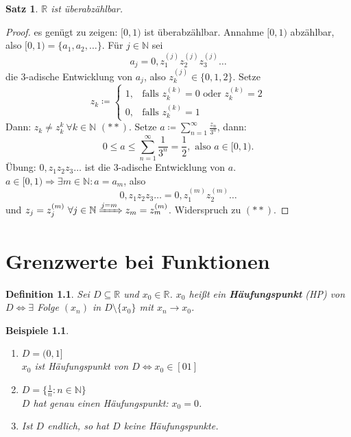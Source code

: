 \documentclass[12pt]{extreport} %
\newcommand{\N}{\mathbb{N}}
\newcommand{\R}{\mathbb{R}}
\theoremstyle{named}
\theoremstyle{dotless}
\newtheorem{satz}[unnamedtheorem]{Satz}
\newtheorem*{beispiele}{Beispiele}
\newtheorem*{definition}{Definition}
\begin{document}
\begin{satz} \label{5.3:satz}
	$\R$ ist überabzählbar.
\end{satz}

\begin{proof}
	es genügt zu zeigen: $[0, 1)$ ist überabzählbar. Annahme $[0, 1)$ abzählbar, also $[0, 1) = \{ a_{1}, a_{2}, \dotsc \}$. Für $j \in \N$ sei
		$$ a_{j} = 0, z_{1}^{(j)} z_{2}^{(j)} z_{3}^{(j)} \dotsc $$
	die 3-adische Entwicklung von $a_{j}$, also $z_{k}^{(j)} \in \{ 0, 1, 2 \}$. Setze
		$$ z_{k} \coloneqq \begin{cases} 1, & \text{falls } z_{k}^{(k)} = 0 \text{ oder } z_{k}^{(k)} = 2 \\ 0, & \text{falls } z_{k}^{(k)} = 1 \end{cases} $$
	Dann: $z_{k} \neq z_{k}^{k} ~\forall k \in \N$ $(**)$. Setze $a \coloneqq \sum_{n=1}^{\infty} \frac{z_{n}}{3^{n}}$, dann:
		$$ 0 \leq a \leq \sum_{n=1}^{\infty} \frac{1}{3^{n}} = \frac{1}{2}, \text{ also } a \in [0, 1). $$
	Übung: $0, z_{1} z_{2} z_{3} \dotsc$ ist die 3-adische Entwicklung von $a$.$a \in [0, 1) \Rightarrow \exists m \in \N: a = a_{m}$, also
		$$ 0, z_{1} z_{2} z_{3} \dotsc = 0, z_{1}^{(m)} z_{2}^{(m)} \dotsc $$
	und $z_{j} = z_{j}^{(m)} ~\forall j \in \N \xRightarrow[]{j = m} z_{m} = z_{m}^{(m)}$. Widerspruch zu $(**)$.
\end{proof}


\newpage


\chapter{Grenzwerte bei Funktionen}

\begin{definition}
	Sei $D \subseteq \R$ und $x_{0} \in \R$. $x_{0}$ hei{\ss}t ein \textbf{Häufungspunkt} (HP) von $D \iff \exists$ Folge $(x_{n})$ in $D \setminus \{ x_{0} \}$ mit $x_{n} \rightarrow x_{0}$.
\end{definition}


\begin{beispiele}
	\begin{enumerate}
		\item $D = (0, 1]$ \\ 
			$x_{0}$ ist Häufungspunkt von $D \iff x_{0} \in [0 1]$
		\item $D = \{ \frac{1}{n} : n \in \N \}$ \\ 
			$D$ hat genau einen Häufungspunkt: $x_{0} = 0$.
		\item Ist $D$ endlich, so hat $D$ keine Häufungspunkte. 
	\end{enumerate}	
\end{beispiele}
\end{document}
